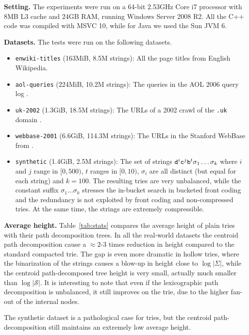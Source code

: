 \documentclass[a4paper,11pt]{article}
\newcommand{\shrinkitems}{\setlength{\itemsep}{0ex}} \newcommand{\sshrinkitems}{\setlength{\itemsep}{-1ex}} \newcommand{\shrinktable}{\setlength{\abovecaptionskip}{-1ex}\setlength{\belowcaptionskip}{-1ex}}
\newcommand{\ttlpar}[1]{\noindent\textbf{#1}}
\theoremstyle{nonumberplain}
\newcommand{\bitnobf}[1]{\text{\texttt{#1}}}
\begin{document}
\ttlpar{Setting.} 
The experiments were run on a 64-bit 2.53GHz Core i7 processor with 8MB
L3 cache and 24GB RAM, running Windows Server 2008 R2. All the C++
code was compiled with MSVC 10, while for Java we used the Sun JVM 6.

\ttlpar{Datasets.} 
The tests were run on the following datasets.
\begin{itemize}\shrinkitems
\item \texttt{enwiki-titles} (163MiB, 8.5M strings): All the page
  titles from English Wikipedia.
\item \texttt{aol-queries} (224MiB, 10.2M strings): The queries in the
  AOL 2006 query log \cite{aolqueries}.
\item \texttt{uk-2002} (1.3GiB, 18.5M strings): The URLs of a 2002
  crawl of the \texttt{.uk} domain \cite{BCSU3}.
\item \texttt{webbase-2001} (6.6GiB, 114.3M strings): The URLs in
  the Stanford WebBase from \cite{lawdatasets}.
\item \texttt{synthetic} (1.4GiB, 2.5M strings): The set of strings
  $\bitnobf{d}^i \bitnobf{c}^j \bitnobf{b}^t \sigma_1\dots\sigma_k$ where $i$ and $j$ range in $[0,
  500)$, $t$ ranges in $[0, 10)$, $\sigma_i$ are all distinct (but
  equal for each string) and $k=100$. The resulting tries are very
  unbalanced, while the constant suffix $\sigma_1\dots\sigma_k$
  stresses the in-bucket search in bucketed front coding and the
  redundancy is not exploited by front coding and non-compressed
  tries. At the same time, the strings are extremely compressible.
\end{itemize}

\ttlpar{Average height.} 
Table~\ref{tab:stats} compares the average
height of plain tries with their path decomposition trees. In all the
real-world datasets the centroid path decomposition cause a $\approx 2$-$3$
times reduction in height compared to the standard compacted trie. The
gap is even more dramatic in hollow tries, where the binarization of
the strings causes a blow-up in height close to $\log |\Sigma|$, while
the centroid path-decomposed tree height is very small, actually much
smaller than $\log |\mathcal{S}|$. It is interesting to note that even
if the lexicographic path decomposition is unbalanced, it still
improves on the  trie, due to the higher fan-out of the
internal nodes. 

The synthetic dataset is a pathological case for tries, but the
centroid path-decomposition still maintains an extremely low average
height.
\end{document}
